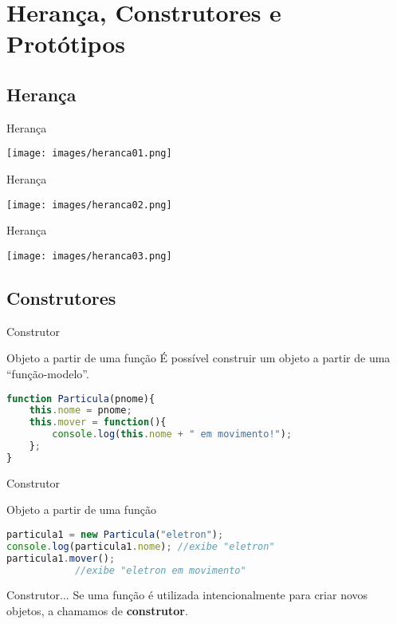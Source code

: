 \documentclass[xcolor=dvipsnames,table]{beamer}
\begin{document}
\section{Herança, Construtores e Protótipos}
\subsection{Herança}
\begin{frame}{Herança}
	\begin{center}
		\texttt{[image: images/heranca01.png]}
	\end{center}
\end{frame}

\begin{frame}{Herança}
	\begin{center}
		\texttt{[image: images/heranca02.png]}
	\end{center}
\end{frame}

\begin{frame}{Herança}
	\begin{center}
		\texttt{[image: images/heranca03.png]}
	\end{center}
\end{frame}

\subsection{Construtores}
\begin{frame}[fragile]{Construtor}
	\begin{block}{Objeto a partir de uma função}
		É possível construir um objeto a partir de uma ``função-modelo''.
		\begin{lstlisting}[language=JavaScript]
function Particula(pnome){
	this.nome = pnome;
	this.mover = function(){
		console.log(this.nome + " em movimento!");
	};
}
\end{lstlisting}	
	\end{block}
\end{frame}

\begin{frame}[fragile]{Construtor}
	\begin{block}{Objeto a partir de uma função}
		\begin{lstlisting}[language=JavaScript]
particula1 = new Particula("eletron");
console.log(particula1.nome); //exibe "eletron"
particula1.mover();	
			//exibe "eletron em movimento"
\end{lstlisting}	
	\end{block} \pause
	\begin{block}{Construtor...}
		Se uma função é utilizada intencionalmente para criar novos objetos, a chamamos de {\bf construtor}.
	\end{block}
\end{frame}
\end{document}
